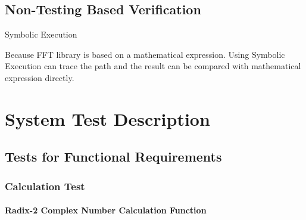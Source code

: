 \documentclass[12pt, titlepage]{article}
\begin{document}
		

\subsection{Non-Testing Based Verification}
{\large Symbolic Execution}

Because FFT library is based on a mathematical expression. Using Symbolic Execution can trace the path and the result can be compared with mathematical expression directly.



\section{System Test Description}
	
\subsection{Tests for Functional Requirements}

\subsubsection{Calculation Test}
		
\paragraph{Radix-2 Complex Number Calculation Function\\}
\end{document}
